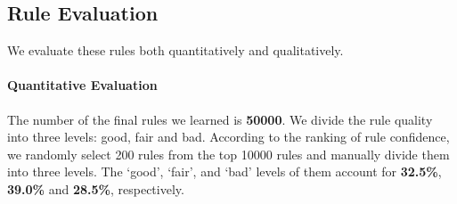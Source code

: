 \subsection{Rule Evaluation}
We evaluate these rules both quantitatively and qualitatively.
\paragraph{Quantitative Evaluation}
The number of the final rules we learned is \textbf{50000}. We divide the rule quality into three levels: good, fair and bad. According to the ranking of rule confidence, we randomly select 200 rules from the top 10000 rules and manually divide them into three levels. The `good', `fair', and `bad' levels of them account for \textbf{32.5\%}, \textbf{39.0\%} and \textbf{28.5\%}, respectively.

